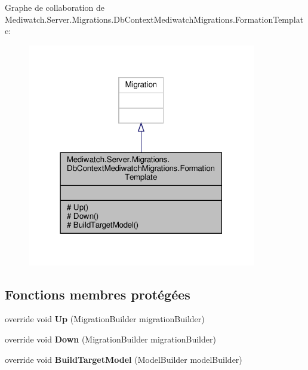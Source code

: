 Graphe de collaboration de Mediwatch.\+Server.\+Migrations.\+Db\+Context\+Mediwatch\+Migrations.\+Formation\+Template\+:
\nopagebreak
\begin{figure}[H]
\begin{center}
\leavevmode
\includegraphics[width=283pt]{class_mediwatch_1_1_server_1_1_migrations_1_1_db_context_mediwatch_migrations_1_1_formation_template__coll__graph}
\end{center}
\end{figure}
\subsection*{Fonctions membres protégées}
\begin{DoxyCompactItemize}
\item 
\mbox{\label{class_mediwatch_1_1_server_1_1_migrations_1_1_db_context_mediwatch_migrations_1_1_formation_template_a764ae13cba383217b4e7139bc5a9b66f}} 
override void {\bfseries Up} (Migration\+Builder migration\+Builder)
\item 
\mbox{\label{class_mediwatch_1_1_server_1_1_migrations_1_1_db_context_mediwatch_migrations_1_1_formation_template_a150807df85878a16eeeebe56483a607d}} 
override void {\bfseries Down} (Migration\+Builder migration\+Builder)
\item 
\mbox{\label{class_mediwatch_1_1_server_1_1_migrations_1_1_db_context_mediwatch_migrations_1_1_formation_template_a09d9c079b563d7491d1a743e484ae716}} 
override void {\bfseries Build\+Target\+Model} (Model\+Builder model\+Builder)
\end{DoxyCompactItemize}


